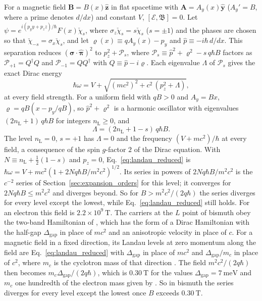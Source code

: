 \documentclass[aps,prd,onecolumn,tightenlines,nofootinbib,notitlepage,11pt,floatfix]{revtex4-2}
\theoremstyle{indentedtheorem}
\begin{document}
For a magnetic field $\mathbf{B}=B(x)\hat{\mathbf{z}}$ in flat spacetime with $\mathbf{A}=A_y(x)\hat{\mathbf{y}}$ ($A_y'=B$, where a prime denotes $d/dx$) and constant $V$, $[\mathcal{E},\mathfrak{B}]=0$. Let $\psi = e^{i(p_y y + p_z z)/\hbar}F(x)\check{\chi}_s$, where $\sigma_z\check{\chi}_s = s\check{\chi}_s$ ($s=\pm 1$) and the phases are chosen so that $\check{\chi}_{-s}=\sigma_x\check{\chi}_s$, and let $\varrho(x)\equiv qA_y(x)-p_y$ and $\hat{p}\equiv -i\hbar\,d/dx$. This separation reduces $(\boldsymbol{\sigma}\cdot\hat{\boldsymbol{\pi}})^2$ to $p_z^2 + \mathcal{P}_s$, where $\mathcal{P}_s \equiv \hat{p}^2 + \varrho^2 - s\,q\hbar B$ factors as $\mathcal{P}_{+1}=Q^\dagger Q$ and $\mathcal{P}_{-1}=QQ^\dagger$ with $Q\equiv\hat{p}-i\varrho$. Each eigenvalue $\Lambda$ of $\mathcal{P}_s$ gives the exact Dirac energy
\begin{equation}
    \hbar\omega = V + \sqrt{(mc^2)^2 + c^2\,(p_z^2+\Lambda)} ,
    \label{eq:landau_reduced}
\end{equation}
at every field strength. For a uniform field with $qB>0$ and $A_y = Bx$, $\varrho = qB(x - p_y/qB)$, so $\hat{p}^2+\varrho^2$ is a harmonic oscillator with eigenvalues $(2n_\text{L}+1)\,q\hbar B$ for integers $n_\text{L}\geq0$, and
\begin{equation}
    \Lambda = (2n_\text{L}+1-s)\,q\hbar B .
    \label{eq:landau_lambda}
\end{equation}
The level $n_\text{L}=0$, $s=+1$ has $\Lambda=0$ and the frequency $(V+mc^2)/\hbar$ at every field, a consequence of the spin $g$-factor $2$ of the Dirac equation. With $N\equiv n_\text{L}+\tfrac{1}{2}(1-s)$ and $p_z=0$, Eq.~\eqref{eq:landau_reduced} is $\hbar\omega = V + mc^2(1+2Nq\hbar B/m^2c^2)^{1/2}$. Its series in powers of $2Nq\hbar B/m^2c^2$ is the $c^{-2}$ series of Section~\ref{sec:expansion_orders} for this level; it converges for $2Nq\hbar B\leq m^2c^2$ and diverges beyond. So for $B > m^2c^2/(2q\hbar)$ the series diverges for every level except the lowest, while Eq.~\eqref{eq:landau_reduced} still holds. For an electron this field is $2.2\times10^{9}~\text{T}$. The carriers at the $L$ point of bismuth obey the two-band Hamiltonian of \citet{Wolff1964Matrix}, which has the form of a Dirac Hamiltonian with the half-gap $\Delta_\text{gap}$ in place of $mc^2$ and an anisotropic velocity in place of $c$. For a magnetic field in a fixed direction, its Landau levels at zero momentum along the field are Eq.~\eqref{eq:landau_reduced} with $\Delta_\text{gap}$ in place of $mc^2$ and $\Delta_\text{gap}/m_c$ in place of $c^2$, where $m_c$ is the cyclotron mass of that direction \citep{Fuseya2015Transport}. The field $m^2c^2/(2q\hbar)$ then becomes $m_c\Delta_\text{gap}/(2q\hbar)$, which is $0.30~\text{T}$ for the values $\Delta_\text{gap}=7~\text{meV}$ and $m_c$ one hundredth of the electron mass given by \citet{Fuseya2015Transport}. So in bismuth the series diverges for every level except the lowest once $B$ exceeds $0.30~\text{T}$.
\end{document}
